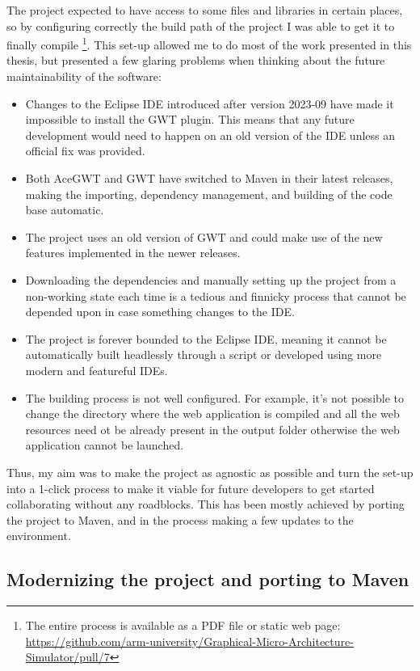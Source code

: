 \newline
The project expected to have access to some files and libraries in certain places, so by configuring correctly the build path of the project I was able to get it to finally compile \footnote{The entire process is available as a PDF file or static web page: \url{https://github.com/arm-university/Graphical-Micro-Architecture-Simulator/pull/7}}.
\newline
This set-up allowed me to do most of the work presented in this thesis, but presented a few glaring problems when thinking about the future maintainability of the software:

\begin{itemize}
	\item Changes to the Eclipse IDE introduced after version 2023-09 have made it impossible to install the GWT plugin. This means that any future development would need to happen on an old version of the IDE unless an official fix was provided.
	\item Both AceGWT and GWT have switched to Maven in their latest releases, making the importing, dependency management, and building of the code base automatic.
	\item The project uses an old version of GWT and could make use of the new features implemented in the newer releases.
	\item Downloading the dependencies and manually setting up the project from a non-working state each time is a tedious and finnicky process that cannot be depended upon in case something changes to the IDE.
	\item The project is forever bounded to the Eclipse IDE, meaning it cannot be automatically built headlessly through a script or developed using more modern and featureful IDEs.
	\item The building process is not well configured. For example, it's not possible to change the directory where the web application is compiled and all the web resources need ot be already present in the output folder otherwise the web application cannot be launched. 
\end{itemize}

Thus, my aim was to make the project as agnostic as possible and turn the set-up into a 1-click process to make it viable for future developers to get started collaborating without any roadblocks. This has been mostly achieved by porting the project to Maven, and in the process making a few updates to the environment.

\subsection*{Modernizing the project and porting to Maven}

